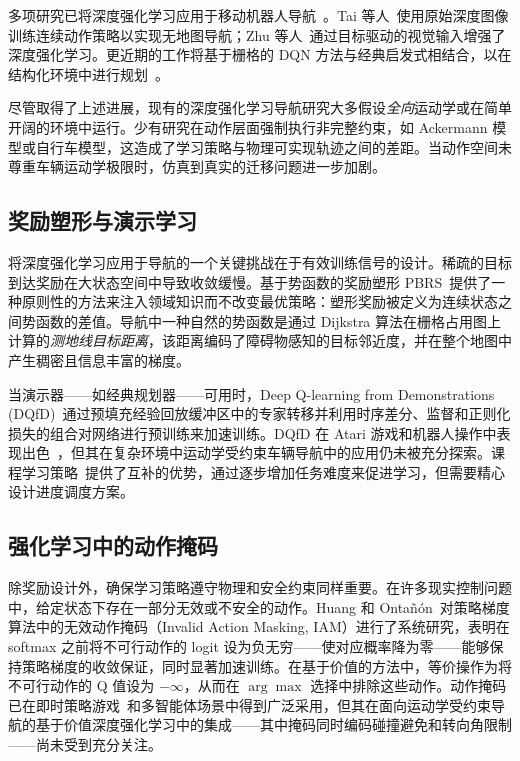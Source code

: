 \documentclass{iopjournal}
\begin{document}
多项研究已将深度强化学习应用于移动机器人导航~\cite{zhou2018dqn,kumar2025dsqn,xu2026rl}。Tai 等人~\cite{tai2017virtual}使用原始深度图像训练连续动作策略以实现无地图导航；Zhu 等人~\cite{zhu2017target}通过目标驱动的视觉输入增强了深度强化学习。更近期的工作将基于栅格的 DQN 方法与经典启发式相结合，以在结构化环境中进行规划~\cite{li2025iqaco,maoudj2020optimal}。

尽管取得了上述进展，现有的深度强化学习导航研究大多假设\emph{全向}运动学或在简单开阔的环境中运行。少有研究在动作层面强制执行非完整约束，如 Ackermann 模型或自行车模型，这造成了学习策略与物理可实现轨迹之间的差距。当动作空间未尊重车辆运动学极限时，仿真到真实的迁移问题进一步加剧。

\subsection{奖励塑形与演示学习}\label{sec:related:reward}

将深度强化学习应用于导航的一个关键挑战在于有效训练信号的设计。稀疏的目标到达奖励在大状态空间中导致收敛缓慢。基于势函数的奖励塑形 PBRS~\cite{ng1999policy}提供了一种原则性的方法来注入领域知识而不改变最优策略：塑形奖励被定义为连续状态之间势函数的差值。导航中一种自然的势函数是通过 Dijkstra 算法在栅格占用图上计算的\emph{测地线目标距离}，该距离编码了障碍物感知的目标邻近度，并在整个地图中产生稠密且信息丰富的梯度。

当演示器——如经典规划器——可用时，Deep Q-learning from Demonstrations (DQfD)~\cite{hester2018deep}通过预填充经验回放缓冲区中的专家转移并利用时序差分、监督和正则化损失的组合对网络进行预训练来加速训练。DQfD 在 Atari 游戏和机器人操作中表现出色~\cite{hester2018deep}，但其在复杂环境中运动学受约束车辆导航中的应用仍未被充分探索。课程学习策略~\cite{bengio2009curriculum}提供了互补的优势，通过逐步增加任务难度来促进学习，但需要精心设计进度调度方案。

\subsection{强化学习中的动作掩码}\label{sec:related:mask}

除奖励设计外，确保学习策略遵守物理和安全约束同样重要。在许多现实控制问题中，给定状态下存在一部分无效或不安全的动作。Huang 和 Onta\~{n}\'on~\cite{huang2022closer}对策略梯度算法中的无效动作掩码（Invalid Action Masking, IAM）进行了系统研究，表明在 softmax 之前将不可行动作的 logit 设为负无穷——使对应概率降为零——能够保持策略梯度的收敛保证，同时显著加速训练。在基于价值的方法中，等价操作为将不可行动作的 Q 值设为 $-\infty$，从而在 $\arg\max$ 选择中排除这些动作。动作掩码已在即时策略游戏~\cite{huang2022closer}和多智能体场景中得到广泛采用，但其在面向运动学受约束导航的基于价值深度强化学习中的集成——其中掩码同时编码碰撞避免和转向角限制——尚未受到充分关注。
\end{document}
